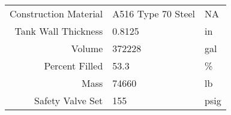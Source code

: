 \documentclass[10pt,parskip=half,
toc=sectionentrywithdots,
bibliography=totocnumbered,
captions=tableheading,numbers=noendperiod]{scrartcl}
\begin{document}
\begin{longtable}[]{@{}rll@{}}
\begin{minipage}[t]{0.23\columnwidth}
Construction Material\strut
\end{minipage} & \begin{minipage}[t]{0.23\columnwidth}\raggedright
A516 Type 70 Steel\strut
\end{minipage} & \begin{minipage}[t]{0.23\columnwidth}\raggedright
NA\strut
\end{minipage}\tabularnewline
\begin{minipage}[t]{0.23\columnwidth}\raggedleft
Tank Wall Thickness\strut
\end{minipage} & \begin{minipage}[t]{0.23\columnwidth}\raggedright
0.8125\strut
\end{minipage} & \begin{minipage}[t]{0.23\columnwidth}\raggedright
in\strut
\end{minipage}\tabularnewline
\begin{minipage}[t]{0.23\columnwidth}\raggedleft
Volume\strut
\end{minipage} & \begin{minipage}[t]{0.23\columnwidth}\raggedright
372228\strut
\end{minipage} & \begin{minipage}[t]{0.23\columnwidth}\raggedright
gal\strut
\end{minipage}\tabularnewline
\begin{minipage}[t]{0.23\columnwidth}\raggedleft
Percent Filled\strut
\end{minipage} & \begin{minipage}[t]{0.23\columnwidth}\raggedright
53.3\strut
\end{minipage} & \begin{minipage}[t]{0.23\columnwidth}\raggedright
\%\strut
\end{minipage}\tabularnewline
\begin{minipage}[t]{0.23\columnwidth}\raggedleft
Mass\strut
\end{minipage} & \begin{minipage}[t]{0.23\columnwidth}\raggedright
74660\strut
\end{minipage} & \begin{minipage}[t]{0.23\columnwidth}\raggedright
lb\strut
\end{minipage}\tabularnewline
\begin{minipage}[t]{0.23\columnwidth}\raggedleft
Safety Valve Set\strut
\end{minipage} & \begin{minipage}[t]{0.23\columnwidth}\raggedright
155\strut
\end{minipage} & \begin{minipage}[t]{0.23\columnwidth}\raggedright
psig\strut
\end{minipage}\tabularnewline
\bottomrule
\end{longtable}
\end{document}
